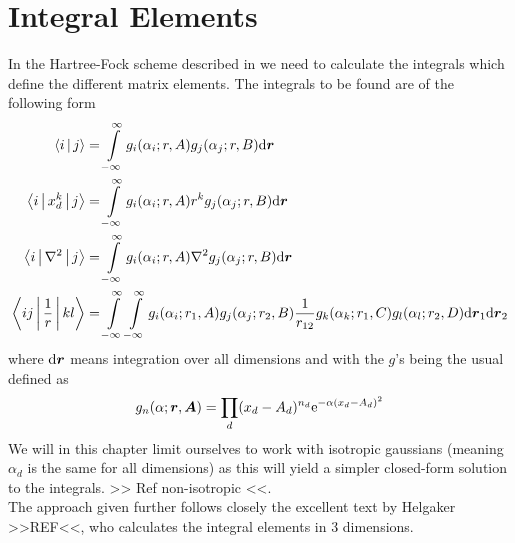 
\section{Integral Elements}
    In the Hartree-Fock scheme described in  we need to
    calculate the integrals which define the different matrix elements. The
    integrals to be found are of the following form
        \begin{equation}
            \begin{aligned}
                \Braket{i|j} &= \int\limits^{\infty}_{-\infty} g_i(\alpha_i;r,A)g_j(\alpha_j;r,B) \mathrm{d}
                \boldsymbol{{r}} \\
                \Braket{i|x^k_d|j} &= \int\limits^{\infty}_{-\infty} g_i(\alpha_i;r,A) r^k
                g_j(\alpha_j;r,B) \mathrm{d} \boldsymbol{{r}} \\
                \Braket{i|\nabla^2|j} &= \int\limits^{\infty}_{-\infty} g_i(\alpha_i;r,A)\nabla^2
                g_j(\alpha_j;r,B) \mathrm{d} \boldsymbol{{r}} \\
                \Braket{ij|\frac{1}{r}|kl} &= \int\limits^{\infty}_{-\infty}\int\limits^{\infty}_{-\infty}
                g_i(\alpha_i;r_1,A)g_j(\alpha_j;r_2,B) \frac{1}{r_{12}}
                g_k(\alpha_k;r_1,C)g_l(\alpha_l;r_2,D) \mathrm{d} \boldsymbol{{r}}_1 \mathrm{d}
                \boldsymbol{{r}}_2\\
            \end{aligned}
        \end{equation}
    where $\mathrm{d}\boldsymbol{{r}}$ means integration over all dimensions and with the
    $g$'s being the usual  defined as
        \begin{equation}
            g_n(\alpha;\boldsymbol{{r}},\boldsymbol{{A}}) = \prod_d (x_d-A_d)^{n_d}
            \mathrm{e}^{-\alpha (x_d-A_d)^2}
            \label{eq:hermiteGauss2}
        \end{equation}
    We will in this chapter limit ourselves to work with isotropic gaussians
    (meaning $\alpha_d$ is the same for all dimensions) as this will yield a
    simpler closed-form solution to the integrals. >> Ref non-isotropic <<. \\
    The approach given further follows closely the excellent text by Helgaker
    >>REF<<, who calculates the integral elements in 3 dimensions.

